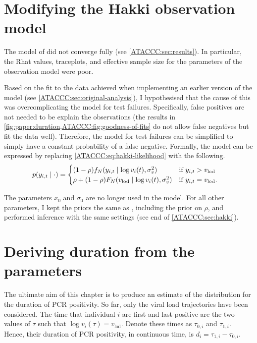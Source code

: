 \documentclass[thesis.tex]{subfiles}
\begin{document}
\section{Modifying the Hakki observation model} \label{ATACCC:sec:observation-modification}

The model of \textcite{hakkiOnset} did not converge fully (see \cref{ATACCC:sec:results}).
In particular, the Rhat values, traceplots, and effective sample size for the parameters of the observation model were poor.

Based on the fit to the data achieved when implementing an earlier version of the model (see \cref{ATACCC:sec:original-analysis}), I hypothesised that the cause of this was overcomplicating the model for test failures.
Specifically, false positives are not needed to be explain the observations (the results in \cref{fig:paper:duration,ATACCC:fig:goodness-of-fits} do not allow false negatives but fit the data well).
Therefore, the model for test failures can be simplified to simply have a constant probability of a false negative.
Formally, the model can be expressed by replacing \cref{ATACCC:eq:hakki-likelihood} with the following.
\begin{align}
p(y_{i,t} \mid \cdot) &= \begin{cases}
    (1 - \rho) f_N(y_{i,t} \mid \log v_i(t), \sigma_v^2) & \text{if $y_{i,t} > v_\text{lod}$}\\
    \rho + (1 - \rho) F_N(v_\text{lod} \mid \log v_i(t), \sigma_v^2) & \text{if $y_{i,t} = v_\text{lod}$.}
\end{cases}
\end{align}

The parameters $x_0$ and $\sigma_0$ are no longer used in the model.
For all other parameters, I kept the priors the same as \textcite{hakkiOnset}, including the prior on $\rho$, and performed inference with the same settings (see end of \cref{ATACCC:sec:hakki}).


\section{Deriving duration from the parameters} \label{ATACCC:sec:duration}
The ultimate aim of this chapter is to produce an estimate of the distribution for the duration of PCR positivity.
So far, only the viral load trajectories have been considered.
The time that individual $i$ are first and last positive are the two values of $\tau$ such that $\log v_i(\tau) = v_\text{lod}$.
Denote these times as $\tau_{0,i}$ and $\tau_{1,i}$.
Hence, their duration of PCR positivity, in continuous time, is $d_i = \tau_{1,i} - \tau_{0,i}$.
\end{document}
